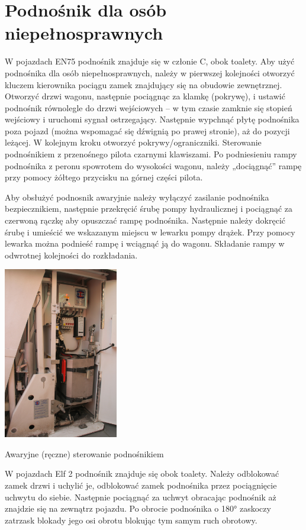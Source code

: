 \section{Podnośnik dla osób niepełnosprawnych}
W pojazdach EN75 podnośnik znajduje się w członie C, obok toalety. Aby użyć podnośnika dla osób niepełnosprawnych, należy w pierwszej kolejności otworzyć kluczem kierownika pociągu zamek znajdujący się na obudowie zewnętrznej. Otworzyć drzwi wagonu, następnie pociągnąc za klamkę (pokrywę), i ustawić podnośnik równolegle do drzwi wejściowych – w tym czasie zamknie się stopień wejściowy i uruchomi sygnał ostrzegający.
Następnie wypchnąć płytę podnośnika poza pojazd (można wspomagać się dźwignią po prawej stronie), aż do pozycji leżącej. W kolejnym kroku otworzyć pokrywy/ograniczniki. Sterowanie podnośnikiem z przenośnego pilota czarnymi
klawiszami. Po podniesieniu rampy podnośnika z peronu spowrotem do wysokości wagonu, należy „dociągnąć” rampę przy pomocy żółtego przycisku na górnej części pilota.

Aby obsłużyć podnosnik awaryjnie należy wyłączyć zasilanie podnośnika bezpiecznikiem, następnie przekręcić śrubę pompy hydraulicznej i pociągnąć za czerwoną rączkę aby opuszczać rampę podnośnika. Następnie należy dokręcić śrubę i umieścić
we wskazanym miejscu w lewarku pompy drążek. Przy pomocy lewarka można podnieść rampę i wciągnąć ją do wagonu. Składanie rampy w odwrotnej kolejności do rozkładania.
	\begin{marginfigure}
	\includegraphics[width=5cm]{skryptkierownik-img/skryptkierownik-img041.jpg}
	\caption{Awaryjne (ręczne) sterowanie podnośnikiem}
\end{marginfigure}

W pojazdach Elf 2 podnośnik znajduje się obok toalety. Należy odblokować zamek drzwi i uchylić je, odblokować zamek
podnośnika przez pociągnięcie uchwytu do siebie. Następnie pociągnąć za uchwyt obracając podnośnik aż znajdzie się na
zewnątrz pojazdu. Po obrocie podnośnika o 180° zaskoczy zatrzask blokady jego osi obrotu blokując tym samym ruch
obrotowy.

